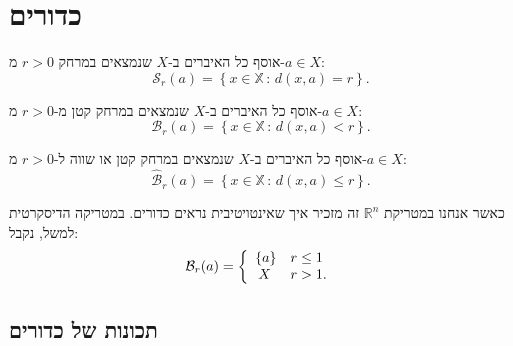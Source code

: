\documentclass{tstextbook}
\begin{document}
\section{כדורים}

\begin{definition}[ספרה]
אוסף כל האיברים ב-\(X\) שנמצאים במרחק \(r>0\) מ-\(a\in X\):
$${\mathcal{S}}_{r}(a)=\left\{x\in\mathbb{X}\,:\,d(x,a)=r\right\}.$$

\end{definition}
\begin{definition}
אוסף כל האיברים ב-\(X\) שנמצאים במרחק קטן מ-\(r>0\) מ-\(a\in X\):
$${\mathcal{B}}_{r}(a)=\left\{x\in\mathbb{X}\,:\,d(x,a)<r\right\}.$$

\end{definition}
\begin{definition}
אוסף כל האיברים ב-\(X\) שנמצאים במרחק קטן או שווה ל-\(r>0\) מ-\(a\in X\):
$${\hat{\mathcal{B}}}_{r}(a)=\left\{x\in\mathbb{X}\,:\,d(x,a)\leq r\right\}.$$

\end{definition}
כאשר אנחנו במטריקת \(\mathbb{R}^n\) זה מזכיר איך שאינטויטיבית נראים כדורים. במטריקה הדיסקרטית למשל, נקבל:
$$\mathcal{B}_{r}(a)=\left\{\begin{array}{l l}{{\{a\}}}&{{r\leq1}}\\ {\:{X}}&{{r>1.}}\end{array}\right.$$

\subsection{תכונות של כדורים}
\end{document}
